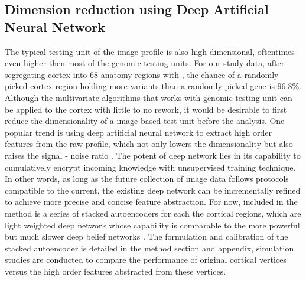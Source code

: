 \subsection{Dimension reduction using Deep Artificial Neural Network}
The typical testing unit of the image profile is also high dimensional, oftentimes even higher then most of the genomic testing units. For our study data, after segregating cortex into 68 anatomy regions with \FS, the chance of a randomly picked cortex region holding more variants than a randomly picked gene is 96.8\%. Although the multivariate algorithms that works with genomic testing unit can be applied to the cortex with little to no rework, it would be desirable to first reduce the dimensionality of a image based test unit before the analysis. One popular trend is using deep artificial neural network to extract high order features from the raw profile, which not only lowers the dimensionality but also raises the signal - noise ratio \cite{DL:Intro1}. The potent of deep network lies in its capability to cumulatively encrypt incoming knowledge with unsupervised training technique. In other words, as long as the future collection of image data follows protocols compatible to the current, the existing deep network can be incrementally refined to achieve more precise and concise feature abstraction. For now, included in the method is a series of stacked autoencoders for each the cortical regions, which are light weighted deep network whose capability is comparable to the more powerful but much slower deep belief networks \cite{DL:SDA1, DL:Intro2}. The formulation and calibration of the stacked autoencoder is detailed in the method section and appendix, simulation studies are conducted to compare the performance of original cortical vertices versus the high order features abstracted from these vertices.

